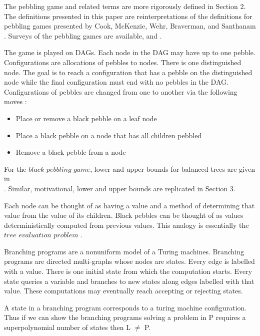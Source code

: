 \documentclass[12pt]{article}
\begin{document}
The pebbling game and related terms are more rigorously defined in Section 2. The definitions presented in this paper are reinterpretations of the definitions for pebbling games presented by Cook, McKenzie, Wehr, Braverman, and Santhanam \cite{c:pebjournal}. Surveys of the pebbling games are available, \cite{ppgr:survey} and \cite{nord:survey2}.

The game is played on DAGs. Each node in the DAG may have up to one pebble. Configurations are allocations of pebbles to nodes. There is one distinguished node. The goal is to reach a configuration that has a pebble on the distinguished node while the final configuration must end with no pebbles in the DAG. Configurations of pebbles are changed from one to another via the following moves : 

\begin{itemize}

\item
Place or remove a black pebble on a leaf node

\item
Place a black pebble on a node that has all children pebbled

\item
Remove a black pebble from a node

\end{itemize}

For the $black$ $pebbling$ $game$, lower and upper bounds for balanced trees are given in \\\cite{c:pebjournal}. Similar, motivational, lower and upper bounds are replicated in Section 3. 

Each node can be thought of as having a value and a method of determining that value from the value of its children. Black pebbles can be thought of as values deterministically computed from previous values. This analogy is essentially the $tree$ $evaluation$ $problem$ \cite{c:pebjournal}.

Branching programs are a nonuniform model of a Turing machines. Branching programs are directed multi-graphs whose nodes are states. Every edge is labelled with a value. There is one initial state from which the computation starts. Every state queries a variable and branches to new states along edges labelled with that value. These computations may eventually reach accepting or rejecting states.

A state in a branching program corresponds to a turing machine configuration. Thus if we can show the branching programs solving a problem in P requires a superpolynomial number of states then L $\ne$ P. 
\end{document}
